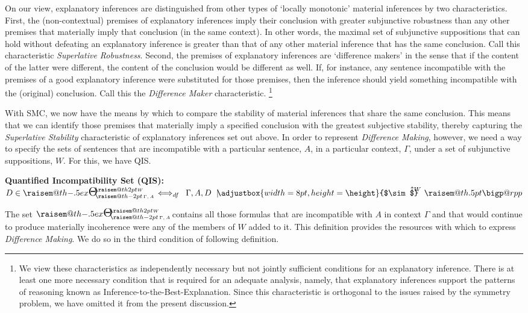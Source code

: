 \documentclass{svjour3}                     %
\makeatletter
\newcommand{\raisemath}[1]{\mathpalette{\raisem@th{#1}}}
\newcommand{\raisem@th}[3]{\raisebox{#1}{$#2#3$}}
\newcommand{\bigperpp}{%
  \mathop{\mathpalette\bigp@rpp\relax}%
  \displaylimits
}
\newcommand{\bigp@rpp}[2]{%
  \vcenter{
    \m@th\hbox{\scalebox{\ifx#1\displaystyle1.3\else1.3\fi}{$#1\perp$}}
  }%
}
\newcommand{\bigperp}{\raisemath{.5pt}{\bigperpp}}
\newcommand{\ssim}{%
     \setbox0=\hbox{$\sim$}%
     \adjustbox{width=8pt,height=\height}{$\sim$}
}
\newcommand{\uuparrow}{%
     \setbox0=\hbox{$\scriptstyle\uparrow$}%
     \raisebox{.2ex}[5pt]{$\scriptstyle\uparrow$}
}
\newcommand{\nmc}{\mathbin{\mid\joinrel\!\!\ssim}}
\newcommand{\qmc}[4][\Gamma,]{{#1#2\,\,\mathrel{\nmc}}^{\!\!\!\!\!\!\!\uuparrow\scriptstyle #4}\,\,#3}
\newcommand{\Bigtheta}{%
     \setbox0=\hbox{$\Theta$}%
     \scalebox{1.4}{$\Theta$}
}
\newcommand{\sris}[2]{\raisemath{-.5ex}{\Bigtheta}^{\!\!\raisemath{2pt}{\scriptscriptstyle #1}}_{\!\!\raisemath{-2pt}{\,\scriptscriptstyle #2\,}}}
\makeatother
\begin{document}
On our view, explanatory inferences are distinguished from other types of `locally monotonic' material inferences by two characteristics. First, the (non-contextual) premises of explanatory inferences imply their conclusion with greater subjunctive robustness than any other premises that materially imply that conclusion (in the same context). In other words, the maximal set of subjunctive suppositions that can hold without defeating an explanatory inference is greater than that of any other material inference that has the same conclusion. Call this characteristic \textit{Superlative Robustness}. Second, the premises of explanatory inferences are `difference makers' in the sense that if the content of the latter were different, the content of the conclusion would be different as well. If, for instance, any sentence incompatible with the premises of a good explanatory inference were substituted for those premises, then the inference should yield something incompatible with the (original) conclusion.   Call this the \textit{Difference Maker} characteristic. \footnote{We view these characteristics as independently necessary but not jointly sufficient conditions for an explanatory inference. There is at least one more necessary condition that is required for an adequate analysis, namely, that explanatory inferences support the patterns of reasoning  known as Inference-to-the-Best-Explanation. Since this characteristic is orthogonal to the issues raised by the symmetry problem, we have omitted it from the present discussion.} 


With SMC, we now have the means by which to compare the stability of material inferences that share the same conclusion. This means that we can identify those premises that materially imply a specified conclusion with the greatest subjective stability, thereby capturing the \textit{Superlative Stability} characteristic of explanatory inferences set out above. In order to represent \textit{Difference Making}, however, we need a way to specify the sets of sentences that are incompatible with a particular sentence, $A$, in a particular context, $\Gamma$,  under a set of subjunctive suppositions, $W$. For this, we have QIS.\newline

\noindent\textbf{Quantified Incompatibility Set (QIS):} \hspace{3mm}$ D \in \sris{W}{\Gamma,\,A} \Longleftrightarrow_{df} \,\,\,\qmc{A, D}{\bigperp}{W} $
\newline

The set $  \sris{W}{\Gamma,\,A}  $contains all those formulas that are incompatible with $A$ in context $ \Gamma $ and that would continue to produce materially incoherence were any of the members of $W$ added to it. This definition provides the resources with which to express \textit{Difference Making}. We do so in the third condition of following definition.\newline
\end{document}
